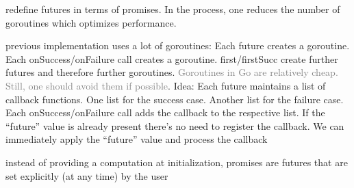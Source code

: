 \documentclass[landscape, a4paper]{article}
\begin{document}
\begin{minipage}[t]{0.2\linewidth}
	\begin{betterlist}
		\item {}
		\begin{betterlist}
			\item redefine futures in terms of promises. In the process, one \alert{reduces} the \alert{number of goroutines} which optimizes performance.
			\item previous implementation uses a lot of goroutines: Each future creates a goroutine. Each onSuccess/onFailure call creates a goroutine. first/firstSucc create further futures and therefore further goroutines. \textcolor{gray}{Goroutines in Go are relatively cheap. Still, one should avoid them if possible}. Idea: Each future maintains a list of callback functions. One list for the success case. Another list for the failure case. Each onSuccess/onFailure call adds the callback to the respective list. If the \enquote{future} value is already present there’s no need to register the callback. We can immediately apply the \enquote{future} value and process the callback
			\item instead of providing a computation at initialization, promises are futures that are set explicitly (at any time) by the user
		\end{betterlist}
\end{betterlist}
\end{minipage}
\end{document}
